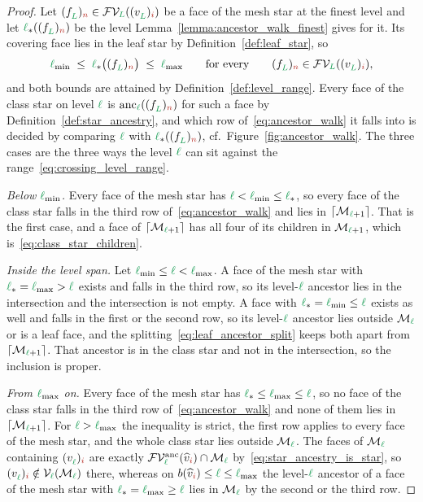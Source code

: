 \documentclass[a4paper, 12pt]{article}
\newcommand{\lmin}{\l_{\min}}
\newcommand{\lmax}{\l_{\max}}
\newcommand{\lstar}{\l_{\ast}}
\newcommand{\green}{\color{ForestGreen}}
\newcommand{\brickred}{\color{BrickRed}}
\newcommand{\V}{\mathcal{V}}
\newcommand{\F}{\mathcal{F}}
\newcommand{\vertex}[2]{\freeQ{v}{}{#1}{#2}}
\newcommand{\vertexClass}[1]{\widehat{v}_{#1}}
\newcommand{\face}[2]{\freeQ{f}{}{#1}{#2}}
\newcommand{\FVl}[1]{\F\V_{#1}}
\newcommand{\coarseIdxone}{{\brickred i}}
\newcommand{\fineIdxtwo}{{\brickred n}}
\renewcommand{\l}{{\green\ell}}
\renewcommand{\L}{{\green L}}
\newcommand{\freeQ}[4]{ ( {#1}^{#2}_{#3} )_{#4}}
\newcommand{\M}{\mathcal{M}}
\theoremstyle{definition}
\theoremstyle{plain}
\numberwithin{equation}{section}
\newcommand{\ancestorPatch}[1]{\lceil #1 \rceil}
\newcommand{\birthLevel}{b}
\newcommand{\anc}[1]{\mathrm{anc}_{#1}}                     %
\newcommand{\FVanc}[1]{\F\V^{\mathrm{anc}}_{#1}}            %
\begin{document}
\begin{proof}
    Let $\face{\L}{\fineIdxtwo} \in \FVl{\L}(\vertex{\L}{\coarseIdxone})$ be a face of the mesh star at the finest level and let $\lstar(\face{\L}{\fineIdxtwo})$ be the level Lemma~\ref{lemma:ancestor_walk_finest} gives for it. Its covering face lies in the leaf star by Definition~\ref{def:leaf_star}, so
    \begin{equation}
        \label{eq:crossing_level_range}
        \lmin \; \leq \; \lstar \big( \face{\L}{\fineIdxtwo} \big) \; \leq \; \lmax \qquad \text{for every} \qquad \face{\L}{\fineIdxtwo} \in \FVl{\L}(\vertex{\L}{\coarseIdxone}),
    \end{equation}
    and both bounds are attained by Definition~\ref{def:level_range}. Every face of the class star on level $\l$ is $\anc{\l}(\face{\L}{\fineIdxtwo})$ for such a face by Definition~\ref{def:star_ancestry}, and which row of~\eqref{eq:ancestor_walk} it falls into is decided by comparing $\l$ with $\lstar(\face{\L}{\fineIdxtwo})$, cf.\ Figure~\ref{fig:ancestor_walk}. The three cases are the three ways the level $\l$ can sit against the range~\eqref{eq:crossing_level_range}.

    \emph{Below $\lmin$.} Every face of the mesh star has $\l < \lmin \leq \lstar$, so every face of the class star falls in the third row of~\eqref{eq:ancestor_walk} and lies in $\ancestorPatch{\M_{\l+1}}$. That is the first case, and a face of $\ancestorPatch{\M_{\l+1}}$ has all four of its children in $\M_{\l+1}$, which is~\eqref{eq:class_star_children}.

    \emph{Inside the level span.} Let $\lmin \leq \l < \lmax$. A face of the mesh star with $\lstar = \lmax > \l$ exists and falls in the third row, so its level-$\l$ ancestor lies in the intersection and the intersection is not empty. A face with $\lstar = \lmin \leq \l$ exists as well and falls in the first or the second row, so its level-$\l$ ancestor lies outside $\M_\l$ or is a leaf face, and the splitting~\eqref{eq:leaf_ancestor_split} keeps both apart from $\ancestorPatch{\M_{\l+1}}$. That ancestor is in the class star and not in the intersection, so the inclusion is proper.

    \emph{From $\lmax$ on.} Every face of the mesh star has $\lstar \leq \lmax \leq \l$, so no face of the class star falls in the third row of~\eqref{eq:ancestor_walk} and none of them lies in $\ancestorPatch{\M_{\l+1}}$. For $\l > \lmax$ the inequality is strict, the first row applies to every face of the mesh star, and the whole class star lies outside $\M_\l$. The faces of $\M_\l$ containing $\vertex{\l}{\coarseIdxone}$ are exactly $\FVanc{\l}(\vertexClass{\coarseIdxone}) \cap \M_\l$ by~\eqref{eq:star_ancestry_is_star}, so $\vertex{\l}{\coarseIdxone} \notin \V_\l(\M_\l)$ there, whereas on $\birthLevel(\vertexClass{\coarseIdxone}) \leq \l \leq \lmax$ the level-$\l$ ancestor of a face of the mesh star with $\lstar = \lmax \geq \l$ lies in $\M_\l$ by the second or the third row.
\end{proof}
\end{document}

